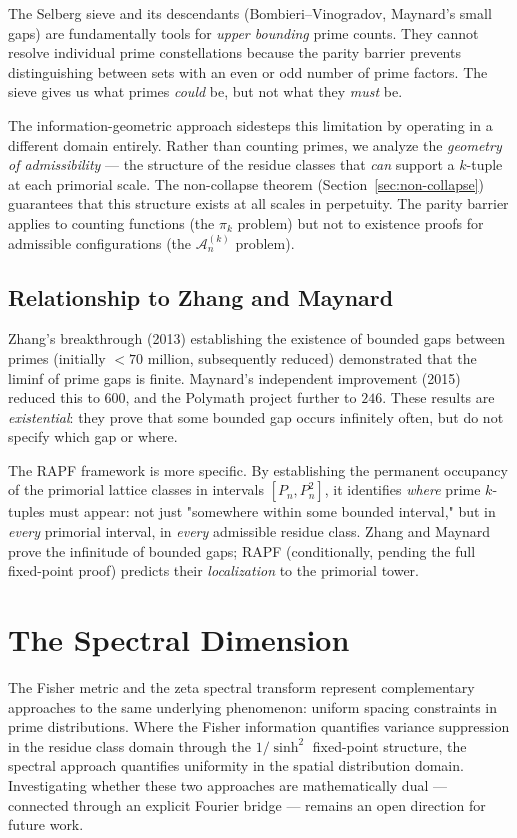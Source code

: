 \documentclass[11pt]{article}
\theoremstyle{remark}
\begin{document}
The Selberg sieve and its descendants (Bombieri--Vinogradov, Maynard's
small gaps) are fundamentally tools for \emph{upper bounding} prime
counts. They cannot resolve individual prime constellations because the
parity barrier prevents distinguishing between sets with an even or
odd number of prime factors. The sieve gives us what primes \emph{could}
be, but not what they \emph{must} be.

The information-geometric approach sidesteps this limitation by operating
in a different domain entirely. Rather than counting primes, we analyze
the \emph{geometry of admissibility} --- the structure of the residue
classes that \emph{can} support a $k$-tuple at each primorial scale.
The non-collapse theorem (Section~\ref{sec:non-collapse}) guarantees
that this structure exists at all scales in perpetuity. The parity
barrier applies to counting functions (the $\pi_k$ problem) but not to
existence proofs for admissible configurations (the $\mathcal{A}_n^{(k)}$
problem).

\subsection{Relationship to Zhang and Maynard}

Zhang's breakthrough (2013) establishing the existence of bounded gaps
between primes (initially $< 70$ million, subsequently reduced)
demonstrated that the liminf of prime gaps is finite. Maynard's
independent improvement (2015) reduced this to $600$, and the
Polymath project further to $246$. These results are \emph{existential}:
they prove that some bounded gap occurs infinitely often, but do not
specify which gap or where.

The RAPF framework is more specific. By establishing the permanent
occupancy of the primorial lattice classes in intervals $[P_n, P_n^2]$,
it identifies \emph{where} prime $k$-tuples must appear: not just
"somewhere within some bounded interval," but in \emph{every} primorial
interval, in \emph{every} admissible residue class. Zhang and Maynard
prove the infinitude of bounded gaps; RAPF (conditionally, pending the
full fixed-point proof) predicts their \emph{localization} to the
primorial tower.

\section{The Spectral Dimension}

The Fisher metric and the zeta spectral transform represent complementary approaches to the same underlying phenomenon: uniform spacing constraints in prime distributions. Where the Fisher information quantifies variance suppression in the residue class domain through the $1/\sinh^2$ fixed-point structure, the spectral approach quantifies uniformity in the spatial distribution domain. Investigating whether these two approaches are mathematically dual — connected through an explicit Fourier bridge — remains an open direction for future work.
\end{document}
